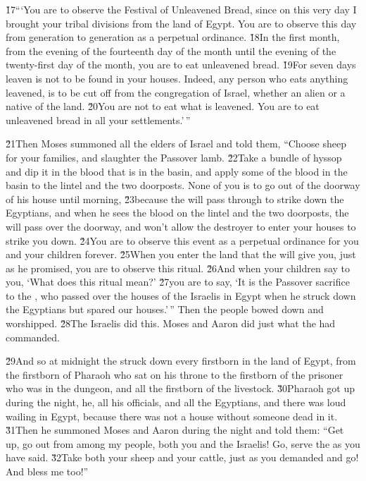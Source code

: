 \v{17}```You are to observe the Festival of Unleavened Bread, since on this very day I brought your tribal divisions from the land of Egypt. You are to observe this day from generation to generation as a perpetual ordinance. \v{18}In the first month, from the evening of the fourteenth day of the month until the evening of the twenty-first day of the month, you are to eat unleavened bread. \v{19}For seven days leaven is not to be found in your houses. Indeed, any person who eats anything leavened, is to be cut off from the congregation of Israel, whether an alien or a native of the land. \v{20}You are not to eat what is leavened. You are to eat unleavened bread in all your settlements.'\,''

\v{21}Then Moses summoned all the elders of Israel and told them, ``Choose sheep for your families, and slaughter the Passover lamb. \v{22}Take a bundle of hyssop and dip it in the blood that is in the basin, and apply some of the blood in the basin to the lintel and the two doorposts. None of you is to go out of the doorway of his house until morning, \v{23}because the  will pass through to strike down the Egyptians, and when he sees the blood on the lintel and the two doorposts, the  will pass over the doorway, and won't allow the destroyer to enter your houses to strike you down. \v{24}You are to observe this event as a perpetual ordinance for you and your children forever. \v{25}When you enter the land that the  will give you, just as he promised, you are to observe this ritual. \v{26}And when your children say to you, `What does this ritual mean?' \v{27}you are to say, `It is the Passover sacrifice to the , who passed over the houses of the Israelis in Egypt when he struck down the Egyptians but spared our houses.'\,'' Then the people bowed down and worshipped. \v{28}The Israelis did this. Moses and Aaron did just what the  had commanded.

\v{29}And so at midnight the  struck down every firstborn in the land of Egypt, from the firstborn of Pharaoh who sat on his throne to the firstborn of the prisoner who was in the dungeon, and all the firstborn of the livestock. \v{30}Pharaoh got up during the night, he, all his officials, and all the Egyptians, and there was loud wailing in Egypt, because there was not a house without someone dead in it. \v{31}Then he summoned Moses and Aaron during the night and told them: ``Get up, go out from among my people, both you and the Israelis! Go, serve the  as you have said. \v{32}Take both your sheep and your cattle, just as you demanded and go! And bless me too!''

